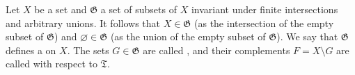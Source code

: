 Let $X$ be a set and $\mathfrak{G}$ a set of subsets of $X$ invariant under finite intersections and arbitrary unions. It follows that $X \in \mathfrak{G}$ (as the intersection of the empty subset of $\mathfrak{G}$) and $\varnothing \in \mathfrak{G}$ (as the union of the empty subset of $\mathfrak{G}$). We say that $\mathfrak{G}$ defines a  on $X$. The sets $G \in \mathfrak{G}$ are called , and their complements $F = X \setminus G$ are called  with respect to $\mathfrak{T}$.
